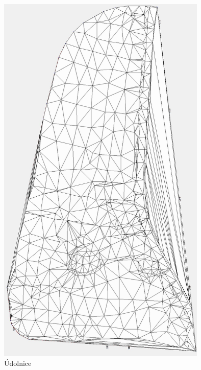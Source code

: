 \documentclass[a4paper, 12pt]{article}
\begin{document}
\clearpage
\begin{figure}[h]
	\centering
	\includegraphics[width=10cm]{dmt_nas.jpg}
	\caption{Údolnice}
\end{figure}
\end{document}
